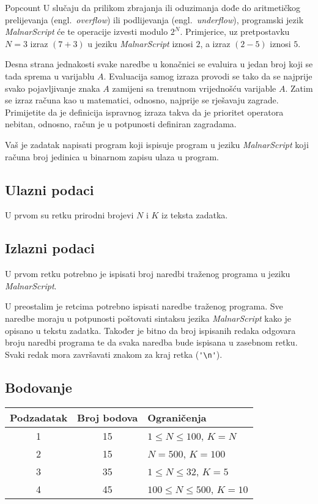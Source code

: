 \begin{statement}[
  problempoints=110,
  timelimit=1 sekunda,
  memorylimit=512 MiB,
]{Popcount}
U slučaju da prilikom zbrajanja ili oduzimanja dođe do aritmetičkog
prelijevanja (engl.\ \textit{overflow}) ili podlijevanja (engl.\
\textit{underflow}), programski jezik \textit{MalnarScript} će te operacije
izvesti modulo $2^N$. Primjerice, uz pretpostavku $N=3$ izraz $(7+3)$ u jeziku
\textit{MalnarScript} iznosi $2$, a izraz $(2-5)$ iznosi $5$.

Desna strana jednakosti svake naredbe u konačnici se evaluira u jedan broj koji
se tada sprema u varijablu $A$. Evaluacija samog izraza provodi se tako da se
najprije svako pojavljivanje znaka $A$ zamijeni sa trenutnom vrijednošću
varijable $A$. Zatim se izraz računa kao u matematici, odnosno, najprije se
rješavaju zagrade. Primijetite da je definicija ispravnog izraza takva da je
prioritet operatora nebitan, odnosno, račun je u potpunosti definiran
zagradama.

Vaš je zadatak napisati program koji ispisuje program u jeziku
\textit{MalnarScript} koji računa broj jedinica u binarnom zapisu ulaza u
program.

\subsection*{Ulazni podaci}
U prvom su retku prirodni brojevi $N$ i $K$ iz teksta zadatka.

\subsection*{Izlazni podaci}
U prvom retku potrebno je ispisati broj naredbi traženog programa u jeziku
\textit{MalnarScript}.

U preostalim je retcima potrebno ispisati naredbe traženog programa. Sve
naredbe moraju u potpunosti poštovati sintaksu jezika \textit{MalnarScript}
kako je opisano u tekstu zadatka. Također je bitno da broj ispisanih redaka
odgovara broju naredbi programa te da svaka naredba bude ispisana u zasebnom
retku. Svaki redak mora završavati znakom za kraj retka (\verb|'\n'|).

\subsection*{Bodovanje}
{\renewcommand{\arraystretch}{1.4}
  \setlength{\tabcolsep}{6pt}
  \begin{tabular}{ccl}
 Podzadatak & Broj bodova & Ograničenja \\ \midrule
  1 & 15 & $1 \le N \le 100$, $K = N$ \\
  2 & 15 & $N = 500$, $K = 100$ \\
  3 & 35 & $1 \le N \le 32$, $K=5$ \\
  4 & 45 & $100 \le N \le 500$, $K=10$
\end{tabular}}


\end{statement}
